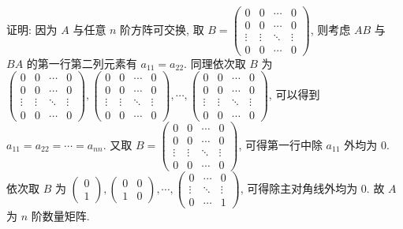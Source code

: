 	 \paragraph{} %
		 证明: 因为 $A$ 与任意 $n$ 阶方阵可交换, 取 $B = \begin{pmatrix}
				 0      & 0      & \cdots & 0      \\
				 0      & 0      & \cdots & 0      \\
				 \vdots & \vdots & \ddots & \vdots \\
				 0      & 0      & \cdots & 0
			 \end{pmatrix}$,
		 则考虑 $AB$ 与 $BA$ 的第一行第二列元素有 $a_{11} = a_{22}$.
		 同理依次取 $B$ 为 $\begin{pmatrix}
				 0      & 0      & \cdots & 0      \\
				 0      & 0      & \cdots & 0      \\
				 \vdots & \vdots & \ddots & \vdots \\
				 0      & 0      & \cdots & 0
			 \end{pmatrix}, \begin{pmatrix}
				 0      & 0      & \cdots & 0      \\
				 0      & 0      & \cdots & 0      \\
				 \vdots & \vdots & \ddots & \vdots \\
				 0      & 0      & \cdots & 0
			 \end{pmatrix}, \cdots, \begin{pmatrix}
				 0      & 0      & \cdots & 0      \\
				 0      & 0      & \cdots & 0      \\
				 \vdots & \vdots & \ddots & \vdots \\
				 0      & 0      & \cdots & 0
			 \end{pmatrix}$,
		 可以得到 $a_{11} = a_{22} = \cdots = a_{nn}$.
		 又取 $B = \begin{pmatrix}
				 0      & 0      & \cdots & 0      \\
				 0      & 0      & \cdots & 0      \\
				 \vdots & \vdots & \ddots & \vdots \\
				 0      & 0      & \cdots & 0
			 \end{pmatrix}$, 可得第一行中除 $a_{11}$ 外均为 $0$.
		 依次取 $B$ 为 $\begin{pmatrix}
				 0 \\
				 1
			 \end{pmatrix}, \begin{pmatrix}
				 0 & 0 \\
				 1 & 0
			 \end{pmatrix}, \cdots, \begin{pmatrix}
				 0      & \cdots & 0      \\
				 \vdots & \ddots & \vdots \\
				 0      & \cdots & 1
			 \end{pmatrix}$,
		 可得除主对角线外均为 $0$.
		 故 $A$ 为 $n$ 阶数量矩阵.


